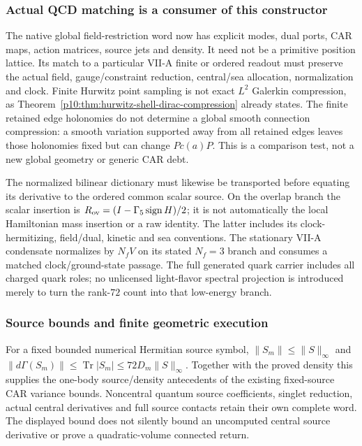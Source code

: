 \documentclass[12pt,a4paper]{article}
\begin{document}
\subsubsection{Actual QCD matching is a consumer of this constructor}
The native global field-restriction word now has explicit modes, dual ports,
CAR maps, action matrices, source jets and density. It need not be a primitive
position lattice. Its match to a particular VII-A finite or ordered readout
must preserve the actual field, gauge/constraint reduction, central/sea
allocation, normalization and clock. Finite Hurwitz point sampling is not
exact $L^2$ Galerkin compression, as
Theorem~\ref{p10:thm:hurwitz-shell-dirac-compression} already states.
The finite retained edge holonomies do not determine a global smooth
connection compression: a smooth variation supported away from all retained
edges leaves those holonomies fixed but can change $P c(a)P$.
This is a comparison test, not a new global geometry or generic CAR debt.

The normalized bilinear dictionary must likewise be transported before
equating its derivative to the ordered common scalar source. On the overlap
branch the scalar insertion is
$R_{\rm ov}=(I-\Gamma_5\operatorname{sign}H)/2$; it is not automatically
the local Hamiltonian mass insertion or a raw identity. The latter includes
its clock-hermitizing, field/dual, kinetic and sea conventions. The stationary
VII-A condensate normalizes by $N_fV$ on its stated $N_f=3$ branch and
consumes a matched clock/ground-state passage. The full generated quark
carrier includes all charged quark roles; no unlicensed light-flavor spectral
projection is introduced merely to turn the rank-$72$ count into that
low-energy branch.


\subsubsection{Source bounds and finite geometric execution}
For a fixed bounded numerical Hermitian source symbol,
$\|S_m\|\le\|S\|_\infty$ and
$\|d\Gamma(S_m)\|\le\operatorname{Tr}|S_m|
 \le72D_m\|S\|_\infty$.
Together with the proved density this supplies the one-body source/density
antecedents of the existing fixed-source CAR variance bounds. Noncentral
quantum source coefficients, singlet reduction, actual central derivatives
and full source contacts retain their own complete word. The displayed bound
does not silently bound an uncomputed central source derivative or prove a
quadratic-volume connected return.
\end{document}
